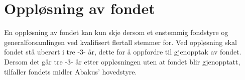 \section{Oppløsning av fondet}
En oppløsning av fondet kan kun skje dersom et enstemmig fondstyre og
generalforsamlingen ved kvalifisert flertall stemmer for. Ved oppløsning skal
fondet stå uberørt i tre -3- år, dette for å oppfordre til gjenopptak av fondet.
Dersom det går tre -3- år etter oppløsningen uten at fondet blir gjenopptatt,
tilfaller fondets midler Abakus' hovedstyre.
